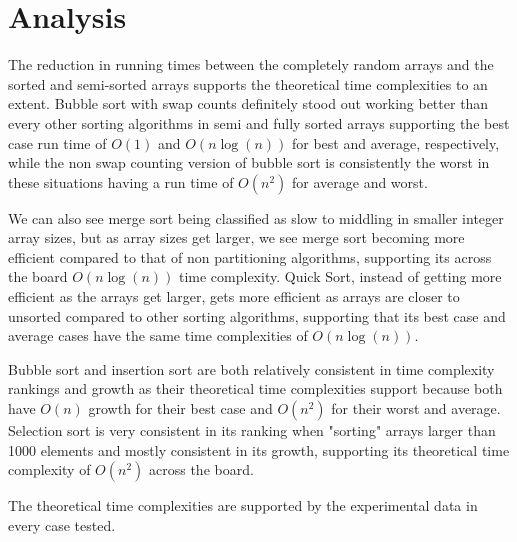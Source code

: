 \documentclass[]{article}
\begin{document}
\section{Analysis}
The reduction in running times between the completely random arrays and the sorted and semi-sorted arrays supports the theoretical time complexities to an extent. Bubble sort with swap counts definitely stood out working better than every other sorting algorithms in semi and fully sorted arrays supporting the best case run time of $ O(1) $ and $ O(n \log(n)) $ for best and average, respectively, while the non swap counting version of bubble sort is consistently the worst in these situations having a run time of $ O(n^2) $ for average and worst.

We can also see merge sort being classified as slow to middling in smaller integer array sizes, but as array sizes get larger, we see merge sort becoming more efficient compared to that of non partitioning algorithms, supporting its across the board $ O(n \log(n)) $ time complexity. Quick Sort, instead of getting more efficient as the arrays get larger, gets more efficient as arrays are closer to unsorted compared to other sorting algorithms, supporting that its best case and average cases have the same time complexities of $ O(n \log(n)) $.

Bubble sort and insertion sort are both relatively consistent in time complexity rankings and growth as their theoretical time complexities support because both have $ O(n) $ growth for their best case and $ O(n^2) $ for their worst and average. Selection sort is very consistent in its ranking when "sorting" arrays larger than 1000 elements and mostly consistent in its growth, supporting its theoretical time complexity of $ O(n^2) $ across the board. 

The theoretical time complexities are supported by the experimental data in every case tested.
\end{document}
